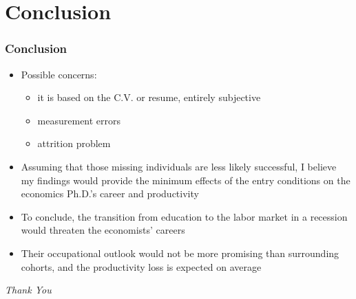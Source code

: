 \documentclass[10pt,svgnames,fragile]{beamer}
\begin{document}
{
	\AtBeginSection{}

\section{Conclusion}
\begin{frame}
	\frametitle{Conclusion}
	\begin{itemize}
		\item Possible concerns:
		\begin{itemize}
			\item it is based on the C.V. or resume, entirely subjective
			\vspace{1 mm}
			\item measurement errors
			\vspace{1 mm}
			\item attrition problem
		\end{itemize}
	\vfill
		\item Assuming that those missing individuals are less likely successful, I believe my findings would provide 	the minimum effects of the entry conditions on the economics Ph.D.'s career and productivity
		\vfill
		\item To conclude, the transition from education to the labor market in a recession would threaten the economists' careers
		\vfill
		\item Their occupational outlook would not be more 		promising than surrounding cohorts, and the productivity loss is expected on average
\vfill	
\end{itemize}
\end{frame}
}

\begin{frame}{}
	\centering \Huge
	\emph{Thank You}
\end{frame}

\end{document}
